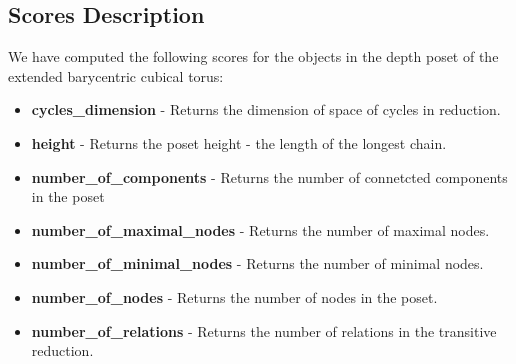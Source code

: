 \documentclass{article}
\begin{document}
\subsection{Scores Description}
\par We have computed the following scores for the objects in the depth poset of the extended barycentric cubical torus:
\begin{itemize}
\item \textbf{cycles\_dimension} - Returns the dimension of space of cycles in reduction.
\item \textbf{height} - Returns the poset height - the length of the longest chain.
\item \textbf{number\_of\_components} - Returns the number of connetcted components in the poset
\item \textbf{number\_of\_maximal\_nodes} - Returns the number of maximal nodes.
\item \textbf{number\_of\_minimal\_nodes} - Returns the number of minimal nodes.
\item \textbf{number\_of\_nodes} - Returns the number of nodes in the poset.
\item \textbf{number\_of\_relations} - Returns the number of relations in the transitive reduction.
\end{itemize}
\end{document}
